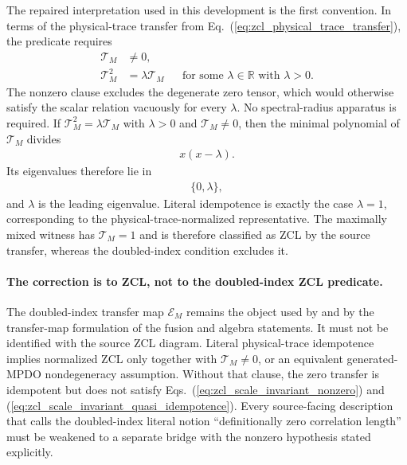 \documentclass{article}
\begin{document}
The repaired interpretation used in this development is the first convention.
In terms of the physical-trace transfer from
Eq.~(\ref{eq:zcl_physical_trace_transfer}), the predicate
 requires
\begin{align}
    \mathcal T_M
    &\ne0,
    \label{eq:zcl_scale_invariant_nonzero}\\
    \mathcal T_M^2
    &=\lambda\mathcal T_M
    &&\text{for some $\lambda\in\mathbb R$ with $\lambda>0$}.
    \label{eq:zcl_scale_invariant_quasi_idempotence}
\end{align}
The nonzero clause excludes the degenerate zero tensor, which would otherwise
satisfy the scalar relation vacuously for every $\lambda$. No spectral-radius
apparatus is required. If
$\mathcal T_M^2=\lambda\mathcal T_M$ with $\lambda>0$ and
$\mathcal T_M\ne0$, then the minimal polynomial of $\mathcal T_M$ divides
\begin{align}
    x(x-\lambda).
    \label{eq:zcl_minimal_polynomial_divisor}
\end{align}
Its eigenvalues therefore lie in
\begin{align}
    \{0,\lambda\},
    \label{eq:zcl_quasi_idempotent_spectrum}
\end{align}
and $\lambda$ is the leading eigenvalue. Literal idempotence is exactly the
case $\lambda=1$, corresponding to the physical-trace-normalized
representative. The maximally mixed witness has $\mathcal T_M=1$ and is
therefore classified as ZCL by the source transfer, whereas the doubled-index
condition excludes it.

\paragraph{The correction is to ZCL, not to the doubled-index ZCL predicate.}
The doubled-index transfer map $\mathcal E_M$ remains the object used by
 and by the transfer-map formulation of the fusion and
algebra statements. It must not be identified with the source ZCL diagram.
Literal physical-trace idempotence implies normalized ZCL only together with
$\mathcal T_M\ne0$, or an equivalent generated-MPDO nondegeneracy assumption.
Without that clause, the zero transfer is idempotent but does not satisfy
Eqs.~(\ref{eq:zcl_scale_invariant_nonzero}) and
(\ref{eq:zcl_scale_invariant_quasi_idempotence}). Every source-facing
description that calls the doubled-index literal notion ``definitionally zero
correlation length'' must be weakened to a separate bridge with the nonzero
hypothesis stated explicitly.
\end{document}
